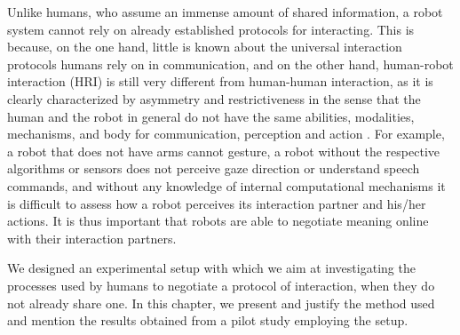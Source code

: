 Unlike humans, who assume an immense amount of shared information, a robot system cannot rely on already established protocols for interacting. This is because, on the one hand, little is known about the universal interaction protocols humans rely on in communication, and on the other hand, human-robot interaction (HRI) is still very different from human-human interaction, as it is clearly characterized by asymmetry and restrictiveness in the sense that the human and the robot in general do not have the same abilities, modalities, mechanisms, and body for communication, perception and action \cite{lohse2010investigating}. For example, a robot that does not have arms cannot gesture, a robot without the respective algorithms or sensors does not perceive gaze direction or understand speech commands, and without any knowledge of internal computational mechanisms it is difficult to assess how a robot perceives its interaction partner and his/her actions. It is thus important that robots are able to negotiate meaning online with their interaction partners.

We designed an experimental setup with which we aim at investigating the processes used by humans to negotiate a protocol of interaction, when they do not already share one. In this chapter, we present and justify the method used and mention the results obtained from a pilot study employing the setup.

